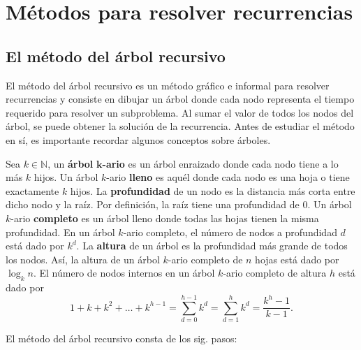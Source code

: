 \chapter{Métodos para resolver recurrencias}

\section{El método del árbol recursivo}

El método del árbol recursivo es un método gráfico e informal para resolver recurrencias y consiste en dibujar un árbol donde cada nodo representa el tiempo requerido para resolver un subproblema.
Al sumar el valor de todos los nodos del árbol, se puede obtener la solución de la recurrencia.
Antes de estudiar el método en sí, es importante recordar algunos conceptos sobre árboles.

Sea \(k\in\mathbb{N}\), un \textbf{árbol} \(\boldsymbol{k}\)\textbf{-ario} es un árbol enraizado donde cada nodo tiene a lo más \(k\) hijos. 
Un árbol \(k\)-ario \textbf{lleno} es aquél donde cada nodo es una hoja o tiene exactamente \(k\) hijos. 
La \textbf{profundidad} de un nodo es la distancia más corta entre dicho nodo y la raíz. 
Por definición, la raíz tiene una profundidad de 0.
Un árbol \(k\)-ario \textbf{completo} es un árbol lleno donde todas las hojas tienen la misma profundidad.
En un árbol \(k\)-ario completo, el número de nodos a profundidad \(d\) está dado por \(k^d\).
La \textbf{altura} de un árbol es la profundidad más grande de todos los nodos.
Así, la altura de un árbol \(k\)-ario completo de \(n\) hojas está dado por \(\log_k{n}\).
El número de nodos internos en un árbol \(k\)-ario completo de altura \(h\) está dado por
\[
  1+k+k^2+\dots+k^{h-1} = 
  \sum_{d=0}^{h-1}k^d =
  \sum_{d=1}^{h}k^d =
  \dfrac{k^h-1}{k-1}.
\]

\newpage
El método del árbol recursivo consta de los sig. pasos:

